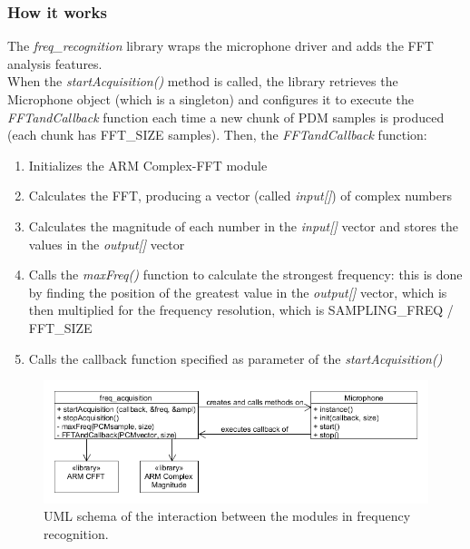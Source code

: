 \subsubsection{How it works}
The \textit{freq\_recognition} library wraps the microphone driver and adds the FFT analysis features. \\
When the \textit{startAcquisition()} method is called, the library retrieves the Microphone object (which is a singleton) and configures it to execute the \textit{FFTandCallback} function each time a new chunk of PDM samples is produced (each chunk has FFT\_SIZE samples). Then, the \textit{FFTandCallback} function:
\begin{enumerate}
	\item Initializes the ARM Complex-FFT module
	\item Calculates the FFT, producing a vector (called \textit{input[]}) of complex numbers
	\item Calculates the magnitude of each number in the \textit{input[]} vector and stores the values in the \textit{output[]} vector
	\item Calls the \textit{maxFreq()} function to calculate the strongest frequency: this is done by finding the position of the greatest value in the \textit{output[]} vector, which is then multiplied for the frequency resolution, which is SAMPLING\_FREQ / FFT\_SIZE
	\item Calls the callback function specified as parameter of the \textit{startAcquisition()}
\end{enumerate}
\begin{figure}[H]
	\centering
	\includegraphics[width=\textwidth]
	{files/images/freqAcquisitionUML.png}
	\caption{UML schema of the interaction between the modules in frequency recognition.}
\end{figure}


